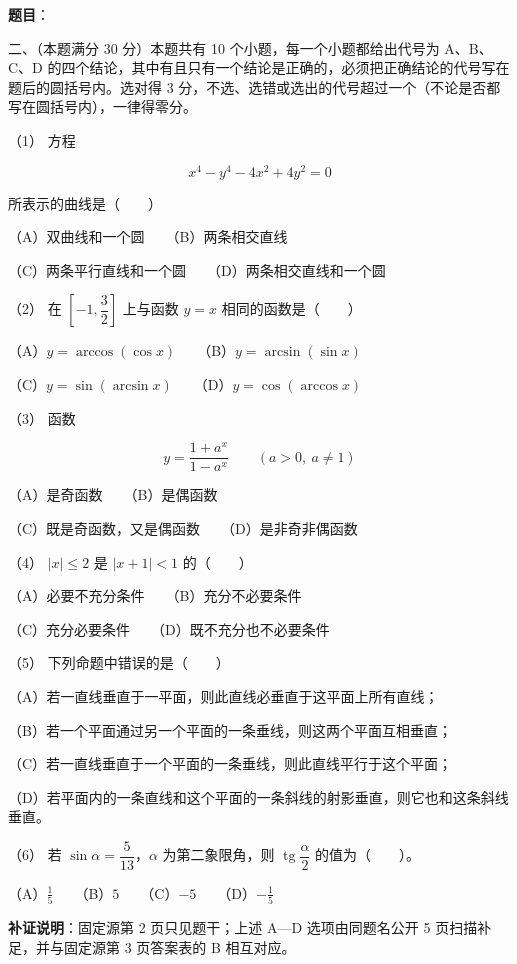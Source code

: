 \begin{answer}

\textbf{题目}：

二、（本题满分 30 分）本题共有 10 个小题，每一个小题都给出代号为 A、B、C、D 的四个结论，其中有且只有一个结论是正确的，必须把正确结论的代号写在题后的圆括号内。选对得 3 分，不选、选错或选出的代号超过一个（不论是否都写在圆括号内），一律得零分。

（1） 方程

\nopagebreak[4]
\[
x^4-y^4-4x^2+4y^2=0
\]

所表示的曲线是\mbox{（　　）}

（A）双曲线和一个圆　　（B）两条相交直线

（C）两条平行直线和一个圆　　（D）两条相交直线和一个圆

（2） 在 $\left[-1,\dfrac32\right]$ 上与函数 $y=x$ 相同的函数是\mbox{（　　）}

（A）$y=\arccos(\cos x)$　　（B）$y=\arcsin(\sin x)$

（C）$y=\sin(\arcsin x)$　　（D）$y=\cos(\arccos x)$

（3） 函数

\nopagebreak[4]
\[
y=\frac{1+a^x}{1-a^x}\qquad(a>0,\ a\ne1)
\]

（A）是奇函数　　（B）是偶函数

（C）既是奇函数，又是偶函数　　（D）是非奇非偶函数

（4） $|x|\le2$ 是 $|x+1|<1$ 的\mbox{（　　）}

（A）必要不充分条件　　（B）充分不必要条件

（C）充分必要条件　　（D）既不充分也不必要条件

（5） 下列命题中错误的是\mbox{（　　）}

（A）若一直线垂直于一平面，则此直线必垂直于这平面上所有直线；

（B）若一个平面通过另一个平面的一条垂线，则这两个平面互相垂直；

（C）若一直线垂直于一个平面的一条垂线，则此直线平行于这个平面；

（D）若平面内的一条直线和这个平面的一条斜线的射影垂直，则它也和这条斜线垂直。

（6） 若 $\sin\alpha=\dfrac5{13}$，$\alpha$ 为第二象限角，则 $\operatorname{tg}\dfrac\alpha2$ 的值为\mbox{（　　）}。

（A）$\frac15$　　（B）$5$　　（C）$-5$　　（D）$-\frac15$

\begin{gktip}
\textbf{补证说明}：固定源第 2 页只见题干；上述 A—D 选项由同题名公开 5 页扫描补足，并与固定源第 3 页答案表的 B 相互对应。
\end{gktip}


\end{answer}

